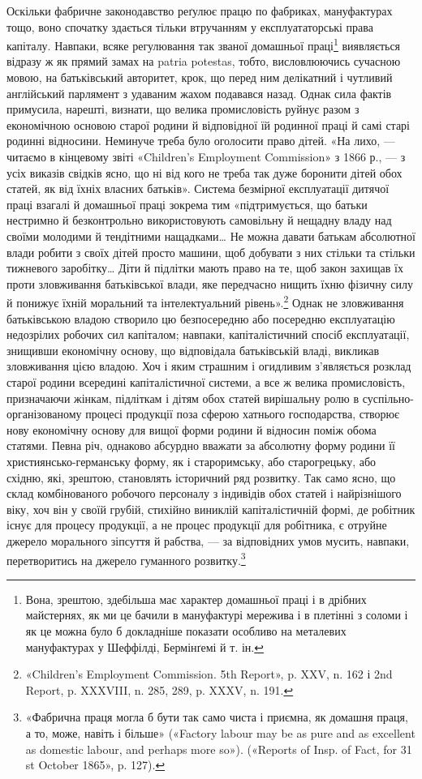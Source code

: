 Оскільки фабричне законодавство реґулює працю по фабриках,
мануфактурах тощо, воно спочатку здається тільки втручанням
у експлуататорські права капіталу. Навпаки, всяке регулювання
так званої домашньої праці\footnote{
Вона, зрештою, здебільша має характер домашньої праці і в
дрібних майстернях, як ми це бачили в мануфактурі мережива і в плетінні
з соломи і як це можна було б докладніше показати особливо на металевих
мануфактурах у Шеффілді, Бермінґемі й т. ін.
} виявляється відразу ж
як прямий замах на patria potestas, тобто, висловлюючись сучасною
мовою, на батьківський авторитет, крок, що перед ним делікатний
і чутливий англійський парлямент з удаваним жахом
подавався назад. Однак сила фактів примусила, нарешті, визнати,
що велика промисловість руйнує разом з економічною основою
старої родини й відповідної їй родинної праці й самі старі родинні
відносини. Неминуче треба було оголосити право дітей. «На лихо,
— читаємо в кінцевому звіті «Children’s Employment Commission»
з 1866 р., — з усіх виказів свідків ясно, що ні від кого
не треба так дуже боронити дітей обох статей, як від їхніх власних
батьків». Система безмірної експлуатації дитячої праці взагалі
й домашньої праці зокрема тим «підтримується, що батьки нестримно
й безконтрольно використовують самовільну й нещадну
владу над своїми молодими й тендітними нащадками\dots{} Не можна
давати батькам абсолютної влади робити з своїх дітей просто
машини, щоб добувати з них стільки та стільки тижневого заробітку\dots{}
Діти й підлітки мають право на те, щоб закон захищав їх
проти зловживання батьківської влади, яке передчасно нищить
їхню фізичну силу й понижує їхній моральний та інтелектуальний
рівень».\footnote{
«Children’s Employment Commission. 5th Report», p. XXV,
n. 162 і 2nd Report, p. XXXVIII, n. 285, 289, p. XXXV, n. 191.
} Однак не зловживання батьківською владою
створило цю безпосередню або посередню експлуатацію недозрілих
робочих сил капіталом; навпаки, капіталістичний спосіб
експлуатації, знищивши економічну основу, що відповідала батьківській
владі, викликав зловживання цією владою. Хоч і яким
страшним і огидливим з’являється розклад старої родини всередині
капіталістичної системи, а все ж велика промисловість,
призначаючи жінкам, підліткам і дітям обох статей вирішальну
ролю в суспільно-організованому процесі продукції поза сферою
хатнього господарства, створює нову економічну основу для
вищої форми родини й відносин поміж обома статями. Певна
річ, однаково абсурдно вважати за абсолютну форму родини її
християнсько-германську форму, як і староримську, або старогрецьку,
або східню, які, зрештою, становлять історичний ряд
розвитку. Так само ясно, що склад комбінованого робочого персоналу
з індивідів обох статей і найрізнішого віку, хоч він у своїй
грубій, стихійно виниклій капіталістичній формі, де робітник
існує для процесу продукції, а не процес продукції для робітника,
є отруйне джерело морального зіпсуття й рабства, — за відповідних
умов мусить, навпаки, перетворитись на джерело гуманного
розвитку.\footnote{
«Фабрична праця могла б бути так само чиста і приємна, як домашня
праця, а то, може, навіть і більше» («Factory labour may be as
pure and as excellent as domestic labour, and perhaps more so»). («Reports
of Insp. of Fact, for 31 st October 1865», p. 127).
}

